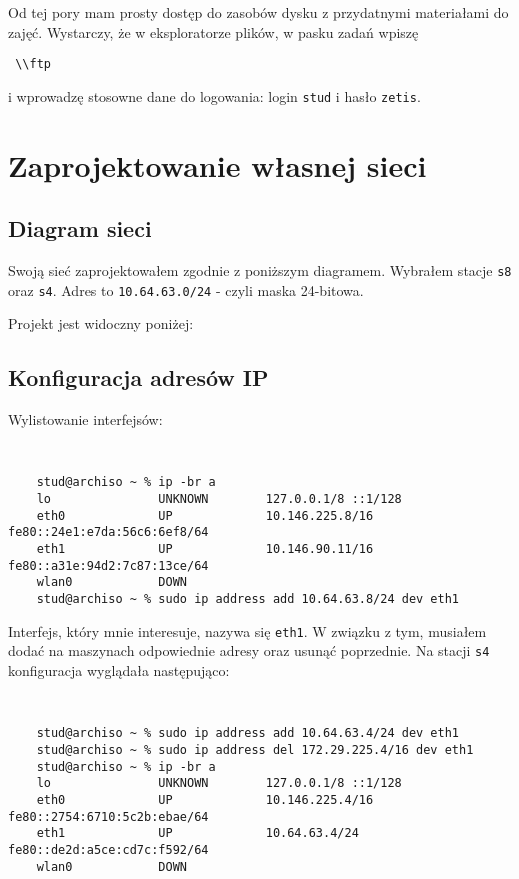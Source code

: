 \documentclass[a4paper,11pt]{article}
\begin{document}
Od tej pory mam prosty dostęp do zasobów dysku z przydatnymi materiałami do zajęć. Wystarczy, że w eksploratorze plików, w pasku zadań wpiszę {\tt \begin{verbatim} \\ftp \end{verbatim}} i wprowadzę stosowne dane do logowania: login {\tt stud} i hasło {\tt zetis}.

\section{Zaprojektowanie własnej sieci}

\subsection{Diagram sieci}

Swoją sieć zaprojektowałem zgodnie z poniższym diagramem. Wybrałem stacje {\tt s8} oraz {\tt s4}. Adres to {\tt 10.64.63.0/24} - czyli maska 24-bitowa.

Projekt jest widoczny poniżej:

\pagebreak


\subsection{Konfiguracja adresów IP} 

Wylistowanie interfejsów:

{\tt
\begin{verbatim}
    stud@archiso ~ % ip -br a
    lo               UNKNOWN        127.0.0.1/8 ::1/128
    eth0             UP             10.146.225.8/16 fe80::24e1:e7da:56c6:6ef8/64
    eth1             UP             10.146.90.11/16 fe80::a31e:94d2:7c87:13ce/64
    wlan0            DOWN
    stud@archiso ~ % sudo ip address add 10.64.63.8/24 dev eth1
\end{verbatim}
}

Interfejs, który mnie interesuje, nazywa się {\tt eth1}. W związku z tym, musiałem dodać na maszynach odpowiednie adresy oraz usunąć poprzednie.
Na stacji {\tt s4} konfiguracja wyglądała następująco:
{\tt
\begin{verbatim}
    stud@archiso ~ % sudo ip address add 10.64.63.4/24 dev eth1
    stud@archiso ~ % sudo ip address del 172.29.225.4/16 dev eth1
    stud@archiso ~ % ip -br a
    lo               UNKNOWN        127.0.0.1/8 ::1/128
    eth0             UP             10.146.225.4/16 fe80::2754:6710:5c2b:ebae/64
    eth1             UP             10.64.63.4/24 fe80::de2d:a5ce:cd7c:f592/64
    wlan0            DOWN
\end{verbatim}
}
\end{document}
